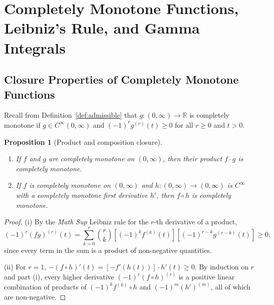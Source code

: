 \documentclass[11pt, a4paper]{article}
\newtheorem{proposition}[theorem]{Proposition}
\theoremstyle{definition}
\theoremstyle{remark}
\newcommand{\R}{\mathbb{R}}
\begin{document}
\section{Completely Monotone Functions, Leibniz's Rule, and Gamma Integrals}
\label{app:cm}

\subsection{Closure Properties of Completely Monotone Functions}
Recall from Definition~\ref{def:admissible} that $g : (0, \infty) \to \R$ is completely monotone if $g \in C^\infty(0, \infty)$ and $(-1)^r g^{(r)}(t) \ge 0$ for all $r \ge 0$ and $t > 0$.

\begin{proposition}[Product and composition closure]
\begin{enumerate}[label=(\roman*)]
    \item If $f$ and $g$ are completely monotone on $(0, \infty)$, then their product $f \cdot g$ is completely monotone.
    \item If $f$ is completely monotone on $(0, \infty)$ and $h : (0, \infty) \to (0, \infty)$ is $C^\infty$ with a completely monotone first derivative $h'$, then $f \circ h$ is completely monotone.
\end{enumerate}
\end{proposition}
\begin{proof}
(i) By the \textit{Math Sup} Leibniz rule for the $r$-th derivative of a product,
\[
(-1)^r (f g)^{(r)}(t) = \sum_{k=0}^r \binom{r}{k} \left[(-1)^k f^{(k)}(t)\right] \left[(-1)^{r-k} g^{(r-k)}(t)\right] \ge 0,
\]
since every term in the sum is a product of non-negative quantities.

\noindent (ii) For $r = 1$, $-(f \circ h)'(t) = \left[-f'(h(t))\right] \cdot h'(t) \ge 0$. By induction on $r$ and part (i), every higher derivative $(-1)^r (f \circ h)^{(r)}$ is a positive linear combination of products of $(-1)^k f^{(k)} \circ h$ and $(-1)^m (h')^{(m)}$, all of which are non-negative.
\end{proof}
\end{document}
